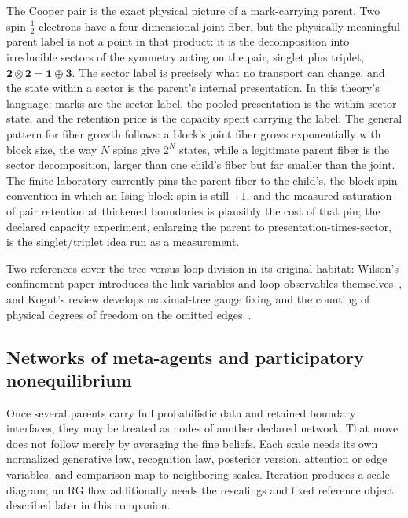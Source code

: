 \documentclass[11pt,letterpaper]{article}
\begin{document}
\begin{physicalreading}
The Cooper pair is the exact physical picture of a mark-carrying parent. Two spin-$\tfrac12$
electrons have a four-dimensional joint fiber, but the physically meaningful parent label is not
a point in that product: it is the decomposition into irreducible sectors of the symmetry acting
on the pair, singlet plus triplet, $\mathbf 2\otimes\mathbf 2=\mathbf 1\oplus\mathbf 3$. The
sector label is precisely what no transport can change, and the state within a sector is the
parent's internal presentation. In this theory's language: marks are the sector label, the
pooled presentation is the within-sector state, and the retention price is the capacity spent
carrying the label. The general pattern for fiber growth follows: a block's joint fiber grows
exponentially with block size, the way $N$ spins give $2^N$ states, while a legitimate parent
fiber is the sector decomposition, larger than one child's fiber but far smaller than the
joint. The finite laboratory currently pins the parent fiber to the child's, the block-spin
convention in which an Ising block spin is still $\pm1$, and the measured saturation of pair
retention at thickened boundaries is plausibly the cost of that pin; the declared capacity
experiment, enlarging the parent to presentation-times-sector, is the singlet/triplet idea run
as a measurement.
\end{physicalreading}

Two references cover the tree-versus-loop division in its original habitat: Wilson's
confinement paper introduces the link variables and loop observables themselves~\cite{Wilson1974},
and Kogut's review develops maximal-tree gauge fixing and the counting of physical degrees of
freedom on the omitted edges~\cite{Kogut1979}.

\subsection{Networks of meta-agents and participatory nonequilibrium}

Once several parents carry full probabilistic data and retained boundary interfaces, they may be treated as nodes of another declared network. That move does not follow merely by averaging the fine beliefs. Each scale needs its own normalized generative law, recognition law, posterior version, attention or edge variables, and comparison map to neighboring scales. Iteration produces a scale diagram; an RG flow additionally needs the rescalings and fixed reference object described later in this companion.
\end{document}
